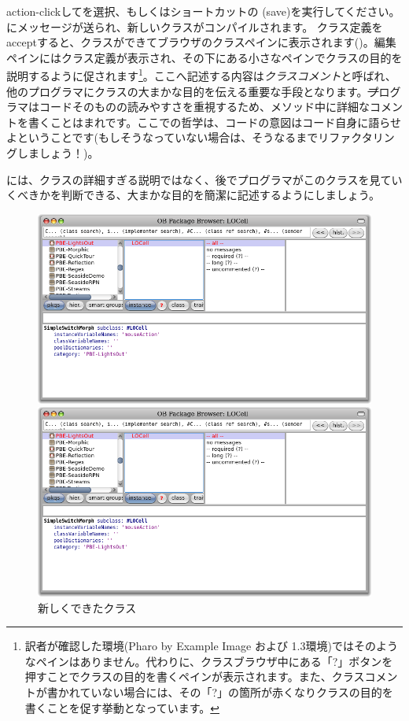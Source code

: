 \documentclass[a4paper,10pt,twoside]{book}
\begin{document}
action-clickしてを選択、もしくはショートカットの (save)を実行してください。にメッセージが送られ、新しいクラスがコンパイルされます。
クラス定義をacceptすると、クラスができてブラウザのクラスペインに表示されます()。編集ペインにはクラス定義が表示され、その下にある小さなペインでクラスの目的を説明するように促されます\footnote{訳者が確認した環境(Pharo by Example Image および 1.3環境)ではそのようなペインはありません。代わりに、クラスブラウザ中にある「?」ボタンを押すことでクラスの目的を書くペインが表示されます。また、クラスコメントが書かれていない場合には、その「?」の箇所が赤くなりクラスの目的を書くことを促す挙動となっています。}。ここへ記述する内容は\emph{クラスコメント}と呼ばれ、他のプログラマにクラスの大まかな目的を伝える重要な手段となります。\st プログラマはコードそのものの読みやすさを重視するため、メソッド中に詳細なコメントを書くことはまれです。ここでの哲学は、コードの意図はコード自身に語らせよということです(もしそうなっていない場合は、そうなるまでリファクタリングしましょう！)。


には、クラスの詳細すぎる説明ではなく、後でプログラマがこのクラスを見ていくべきかを判断できる、大まかな目的を簡潔に記述するようにしましょう。


\begin{figure}[h!t]
\ifluluelse
	{\centerline {\includegraphics[width=\textwidth]{LOCell}}}
	{\centerline {\includegraphics[scale=0.7]{LOCell}}}
\caption{新しくできたクラス }
\end{figure}
\end{document}
